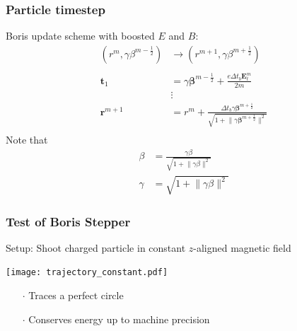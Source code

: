\documentclass[5pt]{beamer}
\begin{document}
\begin{frame}
  \frametitle{Particle timestep}
Boris update scheme with boosted $E$ and $B$: \cite{fallahi2020mithra}\\
\begin{align*}
  \left(r^m, \gamma \beta ^ {m - \frac{1}{2}}\right) &\rightarrow \left(r^{m + 1}, \gamma \beta ^ {m + \frac{1}{2}}\right) \\ \\
  \mathbf{t}_1 &= \gamma \mathbf{\beta}^{m - \frac 1 2} + \frac{e \Delta t_b \mathbf{E}_t^m}{2 m} \\
  &\vdots \\
  \mathbf{r}^{m + 1} &= r^m + \frac{\Delta t_b \gamma \bm{\beta}^{m + \frac 1 2}}{\sqrt{1 + \lVert\gamma \mathbf{\beta}^{m + \frac 1 2}\rVert^2}} \\
\end{align*}
\pause
Note that \\
\begin{align*}
\beta &= \frac{\gamma \beta}{\sqrt{1 + \lVert \gamma \beta \rVert^2}} \\
\gamma &= \sqrt{1 + \lVert \gamma \beta \rVert^2}
\end{align*}
\end{frame}
\begin{frame}
  \frametitle{Test of Boris Stepper}
  Setup: Shoot charged particle in constant $z$-aligned magnetic field\\
  \begin{minipage}{0.45\textwidth}
    \centering
  \texttt{[image: trajectory\_constant.pdf]}
  \end{minipage}
  \hfill
  \begin{minipage}{0.45\textwidth}
  
  \begin{itemize}
    \item[$\cdot$] Traces a perfect circle
    \item[$\cdot$] Conserves energy up to machine precision
  \end{itemize}
\end{minipage}
\end{frame}
\end{document}
